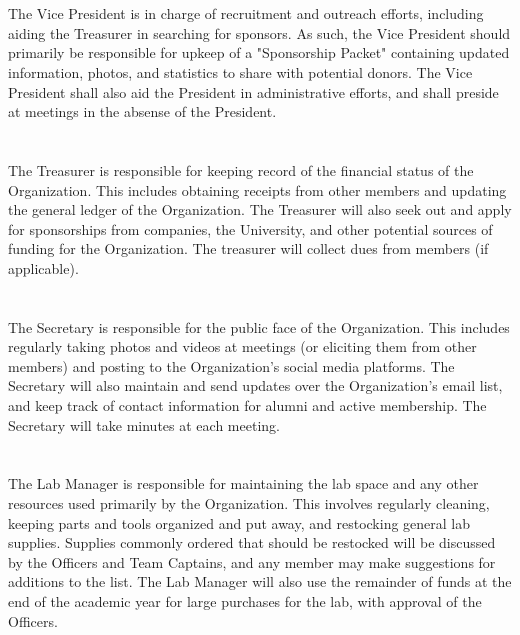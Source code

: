\documentclass[12pt]{cls/constitution}
\begin{document}
\section{}
The Vice President is in charge of recruitment and outreach efforts, including aiding the Treasurer in searching for sponsors. As such, the Vice President should primarily be responsible for upkeep of a "Sponsorship Packet" containing updated information, photos, and statistics to share with potential donors. The Vice President shall also aid the President in administrative efforts, and shall preside at meetings in the absense of the President.

\section{}
The Treasurer is responsible for keeping record of the financial status of the Organization. This includes obtaining receipts from other members and updating the general ledger of the Organization. The Treasurer will also seek out and apply for sponsorships from companies, the University, and other potential sources of funding for the Organization. The treasurer will collect dues from members (if applicable).

\section{}
The Secretary is responsible for the public face of the Organization. This includes regularly taking photos and videos at meetings (or eliciting them from other members) and posting to the Organization's social media platforms. The Secretary will also maintain and send updates over the Organization's email list, and keep track of contact information for alumni and active membership. The Secretary will take minutes at each meeting.

\section{}
The Lab Manager is responsible for maintaining the lab space and any other resources used primarily by the Organization. This involves regularly cleaning, keeping parts and tools organized and put away, and restocking general lab supplies. Supplies commonly ordered that should be restocked will be discussed by the Officers and Team Captains, and any member may make suggestions for additions to the list. The Lab Manager will also use the remainder of funds at the end of the academic year for large purchases for the lab, with approval of the Officers.
\end{document}
